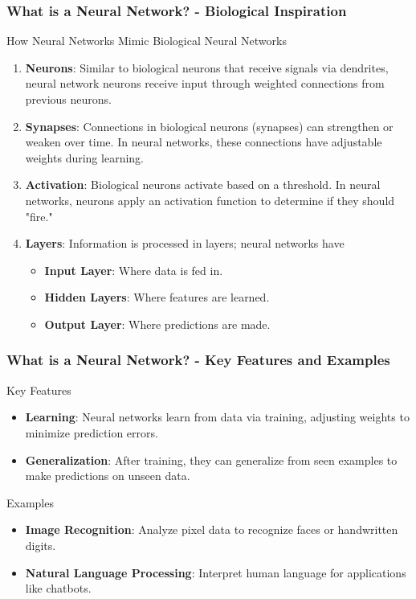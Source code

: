 \documentclass[aspectratio=169]{beamer}
\begin{document}
\begin{frame}[fragile]
    \frametitle{What is a Neural Network? - Biological Inspiration}
    \begin{block}{How Neural Networks Mimic Biological Neural Networks}
        \begin{enumerate}
            \item \textbf{Neurons}: Similar to biological neurons that receive signals via dendrites, neural network neurons receive input through weighted connections from previous neurons.
            \item \textbf{Synapses}: Connections in biological neurons (synapses) can strengthen or weaken over time. In neural networks, these connections have adjustable weights during learning.
            \item \textbf{Activation}: Biological neurons activate based on a threshold. In neural networks, neurons apply an activation function to determine if they should "fire."
            \item \textbf{Layers}: Information is processed in layers; neural networks have 
                \begin{itemize}
                    \item \textbf{Input Layer}: Where data is fed in.
                    \item \textbf{Hidden Layers}: Where features are learned.
                    \item \textbf{Output Layer}: Where predictions are made.
                \end{itemize}
        \end{enumerate}
    \end{block}
\end{frame}

\begin{frame}[fragile]
    \frametitle{What is a Neural Network? - Key Features and Examples}
    \begin{block}{Key Features}
        \begin{itemize}
            \item \textbf{Learning}: Neural networks learn from data via training, adjusting weights to minimize prediction errors.
            \item \textbf{Generalization}: After training, they can generalize from seen examples to make predictions on unseen data.
        \end{itemize}
    \end{block}
    \begin{block}{Examples}
        \begin{itemize}
            \item \textbf{Image Recognition}: Analyze pixel data to recognize faces or handwritten digits.
            \item \textbf{Natural Language Processing}: Interpret human language for applications like chatbots.
        \end{itemize}
    \end{block}
\end{frame}
\end{document}
